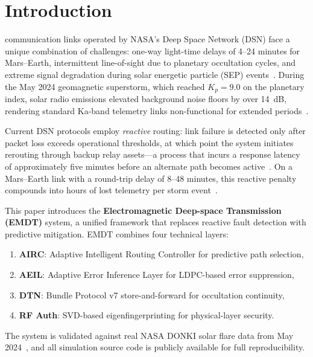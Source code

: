 \documentclass[journal]{IEEEtran}
\begin{document}

\section{Introduction}
 communication links operated by NASA's Deep Space Network (DSN) face a unique combination of challenges: one-way light-time delays of 4--24 minutes for Mars--Earth, intermittent line-of-sight due to planetary occultation cycles, and extreme signal degradation during solar energetic particle (SEP) events~\cite{taylor2006dsn, morabito2002dsn}.
During the May 2024 geomagnetic superstorm, which reached $K_p = 9.0$ on the planetary index, solar radio emissions elevated background noise floors by over 14~dB, rendering standard Ka-band telemetry links non-functional for extended periods~\cite{schrijver2015solar}.

Current DSN protocols employ \emph{reactive} routing: link failure is detected only after packet loss exceeds operational thresholds, at which point the system initiates rerouting through backup relay assets---a process that incurs a response latency of approximately five minutes before an alternate path becomes active~\cite{jpl2017ccsds}.
On a Mars--Earth link with a round-trip delay of 8--48 minutes, this reactive penalty compounds into hours of lost telemetry per storm event~\cite{hapgood2011towards}.

This paper introduces the \textbf{Electromagnetic Deep-space Transmission (EMDT)} system, a unified framework that replaces reactive fault detection with predictive mitigation.
EMDT combines four technical layers:
\begin{enumerate}
    \item \textbf{AIRC}: Adaptive Intelligent Routing Controller for predictive path selection,
    \item \textbf{AEIL}: Adaptive Error Inference Layer for LDPC-based error suppression,
    \item \textbf{DTN}: Bundle Protocol v7 store-and-forward for occultation continuity,
    \item \textbf{RF Auth}: SVD-based eigenfingerprinting for physical-layer security.
\end{enumerate}

The system is validated against real NASA DONKI solar flare data from May 2024~\cite{nasa2024donki}, and all simulation source code is publicly available for full reproducibility.
\end{document}
